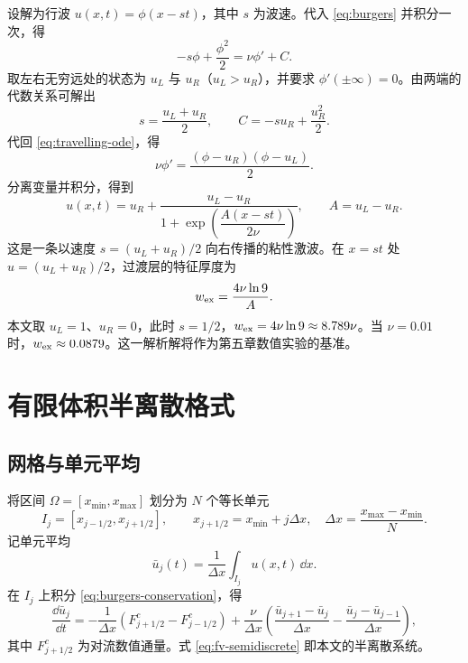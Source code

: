 设解为行波 $u(x,t)=\phi(x-st)$，其中 $s$ 为波速。代入 \eqref{eq:burgers} 并积分一次，得
\begin{equation}
  -s\phi+\frac{\phi^2}{2}=\nu\phi'+C.
  \label{eq:travelling-ode}
\end{equation}
取左右无穷远处的状态为 $u_L$ 与 $u_R$（$u_L>u_R$），并要求 $\phi'(\pm\infty)=0$。由两端的代数关系可解出
\begin{equation}
  s=\frac{u_L+u_R}{2},\qquad
  C=-s u_R+\frac{u_R^2}{2}.
  \label{eq:wave-speed}
\end{equation}
代回 \eqref{eq:travelling-ode}，得
\begin{equation}
  \nu\phi'=\frac{(\phi-u_R)(\phi-u_L)}{2}.
  \label{eq:travelling-phi}
\end{equation}
分离变量并积分，得到
\begin{equation}
  u(x,t)=u_R+\frac{u_L-u_R}{1+\exp\!\left(\dfrac{A(x-st)}{2\nu}\right)},
  \qquad A=u_L-u_R.
  \label{eq:exact-shock}
\end{equation}
这是一条以速度 $s=(u_L+u_R)/2$ 向右传播的粘性激波。在 $x=st$ 处 $u=(u_L+u_R)/2$，过渡层的特征厚度为
\begin{equation}
  w_{\rm ex}=\frac{4\nu\ln 9}{A}.
  \label{eq:layer-width}
\end{equation}
本文取 $u_L=1$、$u_R=0$，此时 $s=1/2$，$w_{\rm ex}=4\nu\ln9\approx8.789\nu$。当 $\nu=0.01$ 时，$w_{\rm ex}\approx0.0879$。这一解析解将作为第五章数值实验的基准。

\section{有限体积半离散格式}
\label{sec:fv-discretization}

\subsection{网格与单元平均}

将区间 $\Omega=[x_{\min},x_{\max}]$ 划分为 $N$ 个等长单元
\begin{equation}
  I_j=\left[x_{j-1/2},x_{j+1/2}\right],\qquad
  x_{j+1/2}=x_{\min}+j\Delta x,\quad \Delta x=\frac{x_{\max}-x_{\min}}{N}.
\end{equation}
记单元平均
\begin{equation}
  \bar u_j(t)=\frac{1}{\Delta x}\int_{I_j}u(x,t)\,\dd x.
\end{equation}
在 $I_j$ 上积分 \eqref{eq:burgers-conservation}，得
\begin{equation}
  \frac{\dd\bar u_j}{\dd t}
  =-\frac{1}{\Delta x}\left(F^{c}_{j+1/2}-F^{c}_{j-1/2}\right)
  +\frac{\nu}{\Delta x}\left(\frac{\bar u_{j+1}-\bar u_j}{\Delta x}
  -\frac{\bar u_j-\bar u_{j-1}}{\Delta x}\right),
  \label{eq:fv-semidiscrete}
\end{equation}
其中 $F^{c}_{j+1/2}$ 为对流数值通量。式 \eqref{eq:fv-semidiscrete} 即本文的半离散系统。

